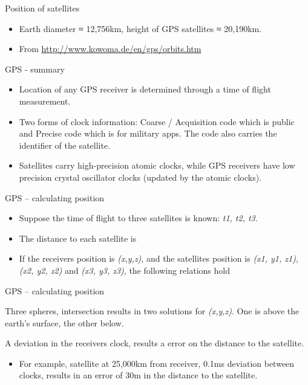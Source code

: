 \documentclass[compress]{beamer}
\providecommand{\tightlist}{%
  \setlength{\itemsep}{0pt}\setlength{\parskip}{0pt}}
\begin{document}
\begin{frame}{Position of satellites}

\begin{itemize}
\tightlist
\item
  Earth diameter ≈ 12,756km, height of GPS satellites ≈ 20,190km.
\item
  From \url{http://www.kowoma.de/en/gps/orbits.htm}
\end{itemize}

\end{frame}

\begin{frame}{GPS - summary}

\begin{itemize}
\tightlist
\item
  Location of any GPS receiver is determined through a time of flight
  measurement.
\item
  Two forms of clock information: Coarse / Acquisition code which is
  public and Precise code which is for military apps. The code also
  carries the identifier of the satellite.
\item
  Satellites carry high-precision atomic clocks, while GPS receivers
  have low precision crystal oscillator clocks (updated by the atomic
  clocks).
\end{itemize}

\end{frame}

\begin{frame}{GPS -- calculating position}

\begin{itemize}
\tightlist
\item
  Suppose the time of flight to three satellites is known: \emph{t1, t2,
  t3}.
\item
  The distance to each satellite is
\item
  If the receivers position is \emph{(x,y,z)}, and the satellites
  position is \emph{(x1, y1, z1)}, \emph{(x2, y2, z2)} and \emph{(x3,
  y3, z3)}, the following relations hold
\end{itemize}

\end{frame}

\begin{frame}{GPS -- calculating position}

Three spheres, intersection results in two solutions for \emph{(x,y,z)}.
One is above the earth's surface, the other below.

A deviation in the receivers clock, results a error on the distance to
the satellite.

\begin{itemize}
\tightlist
\item
  For example, satellite at 25,000km from receiver, 0.1ms deviation
  between clocks, results in an error of 30m in the distance to the
  satellite.
\end{itemize}

\end{frame}
\end{document}
